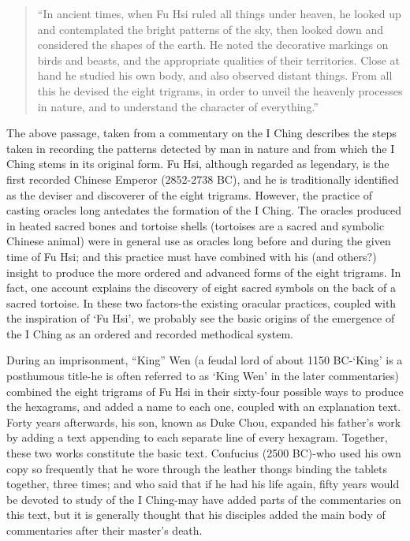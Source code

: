 \documentclass[11pt]{book}
\begin{document}
\begin{quote}
``In ancient times, when Fu Hsi ruled all things under heaven, he looked up and contemplated the bright patterns of the sky, then looked down and considered the shapes of the earth. He noted the decorative markings on birds and beasts, and the appropriate qualities of their territories. Close at hand he studied his own body, and also observed distant things. From all this he devised the eight trigrams, in order to unveil the heavenly processes in nature, and to understand the character of everything.''
\end{quote}

The above passage, taken from a commentary on the I Ching describes the steps taken in recording the patterns detected by man in nature and from which the I Ching stems in its original form. Fu Hsi, although regarded as legendary, is the first recorded Chinese Emperor (2852-2738 BC), and he is traditionally identified as the deviser and discoverer of the eight trigrams. However, the practice of casting oracles long antedates the formation of the I Ching. The oracles produced in heated sacred bones and tortoise shells (tortoises are a sacred and symbolic Chinese animal) were in general use as oracles long before and during the given time of Fu Hsi; and this practice must have combined with his (and others?) insight to produce the more ordered and advanced forms of the eight trigrams. In fact, one account explains the discovery of eight sacred symbols on the back of a sacred tortoise. In these two factors-the existing oracular practices, coupled with the inspiration of `Fu Hsi', we probably see the basic origins of the emergence of the I Ching as an ordered and recorded methodical system.

During an imprisonment, ``King'' Wen (a feudal lord of about 1150 BC-`King' is a posthumous title-he is often referred to as `King Wen' in the later commentaries) combined the eight trigrams of Fu Hsi in their sixty-four possible ways to produce the hexagrams, and added a name to each one, coupled with an explanation text. Forty years afterwards, his son, known as Duke Chou, expanded his father's work by adding a text appending to each separate line of every hexagram. Together, these two works constitute the basic text. Confucius (2500 BC)-who used his own copy so frequently that he wore through the leather thongs binding the tablets together, three times; and who said that if he had his life again, fifty years would be devoted to study of the I Ching-may have added parts of the commentaries on this text, but it is generally thought that his disciples added the main body of commentaries after their master's death.
\end{document}
